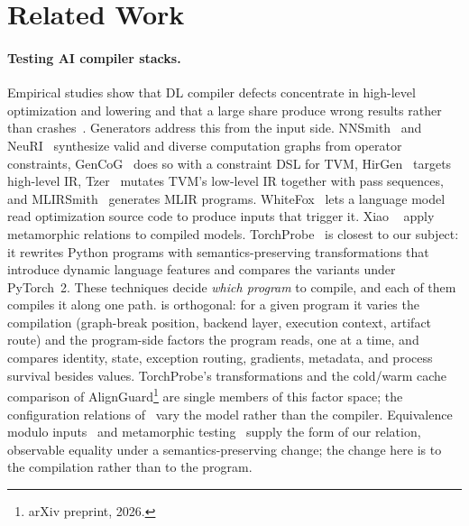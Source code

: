 \section{Related Work}
\label{sec:related}

\paragraph{Testing AI compiler stacks.} Empirical studies show that DL compiler defects concentrate in
high-level optimization and lowering and that a large share produce wrong results rather than
crashes~\cite{DBLP:conf/sigsoft/ShenM0TCC21,DBLP:journals/tpds/LiLLSYYLGYQ21}. Generators address this from the input side. NNSmith~\cite{DBLP:conf/asplos/LiuLRTLPZ23} and
NeuRI~\cite{DBLP:conf/sigsoft/0004PW023} synthesize valid and diverse computation graphs from operator constraints, GenCoG~\cite{DBLP:conf/issta/WangNMCWB023}
does so with a constraint DSL for TVM, HirGen~\cite{DBLP:conf/issta/MaS00C23} targets high-level IR, Tzer~\cite{DBLP:journals/pacmpl/LiuWYDZ22} mutates TVM's
low-level IR together with pass sequences, and MLIRSmith~\cite{DBLP:conf/kbse/WangCXLWSZ23} generates MLIR programs.
WhiteFox~\cite{DBLP:journals/pacmpl/YangDLY0J024} lets a language model read optimization source code to produce inputs that trigger it.
Xiao \etal~\cite{DBLP:conf/sigmetrics/XiaoLYPW22} apply metamorphic relations to compiled models. TorchProbe~\cite{DBLP:conf/aplas/SuGPS23} is closest
to our subject: it rewrites Python programs with semantics-preserving transformations that introduce dynamic
language features and compares the variants under PyTorch~2. These techniques decide \emph{which program} to
compile, and each of them compiles it along one path. \tool is orthogonal: for a given program it varies the
compilation (graph-break position, backend layer, execution context, artifact route) and the program-side
factors the program reads, one at a time, and compares identity, state, exception routing, gradients, metadata,
and process survival besides values. TorchProbe's transformations and the cold/warm cache comparison of
AlignGuard\footnote{arXiv preprint, 2026.} are single members of this factor space; the configuration
relations of~\cite{DBLP:conf/sigmetrics/XiaoLYPW22} vary the model rather than the compiler. Equivalence modulo
inputs~\cite{DBLP:conf/pldi/LeAS14} and metamorphic testing~\cite{DBLP:journals/csur/ChenKLPTTZ18,DBLP:journals/tse/SeguraFSC16} supply the
form of our relation, observable equality under a semantics-preserving change; the change here is to the
compilation rather than to the program.


